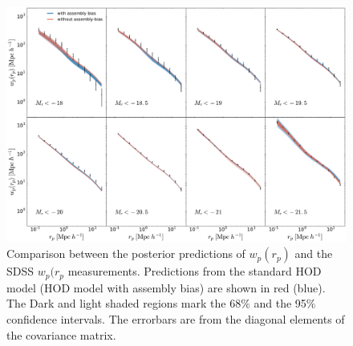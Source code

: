 \documentclass[twocolumn]{aastex61}
\begin{document}
\begin{figure}[p]~\\
\begin{center}
\includegraphics[width=\textwidth]{wpmodel.pdf}
\caption{Comparison between the posterior predictions of $w_{p}(r_{p})$ and the SDSS $w_{p}(r_{p}$ measurements. Predictions from the standard HOD model (HOD model with assembly bias) are shown in red (blue). The Dark and light shaded regions mark the 68$\%$ and the 95$\%$ confidence intervals. The errorbars are from the diagonal elements of the covariance matrix.}
\label{fig:wpmodel}
\end{center}
\end{figure}
\end{document}
